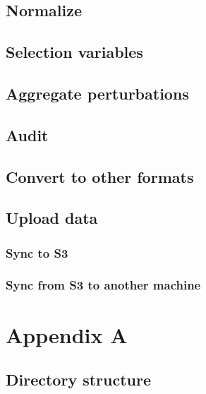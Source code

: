 \documentclass[]{book}
\begin{document}
\hypertarget{normalize}{%
\section{Normalize}\label{normalize}}

\hypertarget{selection-variables}{%
\section{Selection variables}\label{selection-variables}}

\hypertarget{aggregate-perturbations}{%
\section{Aggregate perturbations}\label{aggregate-perturbations}}

\hypertarget{audit}{%
\section{Audit}\label{audit}}

\hypertarget{convert-to-other-formats}{%
\section{Convert to other formats}\label{convert-to-other-formats}}

\hypertarget{upload-data}{%
\section{Upload data}\label{upload-data}}

\hypertarget{sync-to-s3}{%
\subsection{Sync to S3}\label{sync-to-s3}}

\hypertarget{sync-from-s3-to-another-machine}{%
\subsection{Sync from S3 to another
machine}\label{sync-from-s3-to-another-machine}}

\hypertarget{appendix-appendix}{%
\appendix}


\hypertarget{appendix-a}{%
\chapter{Appendix A}\label{appendix-a}}

\hypertarget{directory-structure}{%
\section{Directory structure}\label{directory-structure}}


\end{document}
